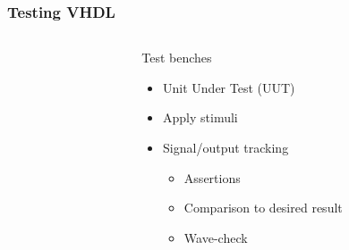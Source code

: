 \documentclass[british,10pt]{beamer}
\begin{document}
\begin{frame}\frametitle{Testing VHDL}
\begin{columns}
\begin{column}{0.05\textwidth}
\end{column}
\begin{column}{0.55\textwidth}
Test benches
\begin{itemize}
\item Unit Under Test (UUT)
\item Apply stimuli
\item Signal/output tracking
\begin{itemize}
\item Assertions
\item Comparison to desired result
\item Wave-check
\end{itemize}
\end{itemize}
\end{column}
\raggedleft

\end{columns}
\end{frame}
\end{document}
